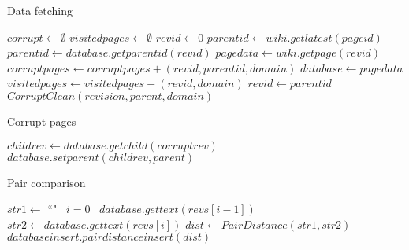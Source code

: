 \newcommand{\tab}[1]{\hspace{.08\textwidth}{#1}}
\newcommand{\LineIf}[3]{ {#1}
  \algorithmicif\ {#2}
  \algorithmicelse\ {#3} }

\begin{algorithm}
  \caption{Data fetching}
  \begin{algorithmic}
    \State $corrupt \gets \emptyset$
    \State $visitedpages \gets \emptyset$
    \State $revid \gets 0$
    \State $parentid \gets wiki.getlatest(pageid)$
    \State $parentid \gets database.getparentid(revid)$
    \Else
    \State $pagedata \gets wiki.getpage(revid)$
    \EndIf
    \State $corruptpages \gets corruptpages + (revid, parentid, domain)$
    \Else
    \State $database \gets page data$
    \EndIf
    \State $visitedpages \gets visitedpages + (revid, domain)$
    \State $revid \gets parentid$
    \EndWhile
    \State $CorruptClean(revision, parent, domain)$
    \EndFor
    \EndProcedure
  \end{algorithmic}
\end{algorithm}

\begin{algorithm}
  \caption{Corrupt pages}\label{corrupt-clean}
  \begin{algorithmic}
    \State $childrev \gets database.getchild(corruptrev)$
    \State $database.setparent(childrev, parent)$ 
    \EndProcedure
  \end{algorithmic}
\end{algorithm}

\begin{algorithm}
\caption{Pair comparison}
  \begin{algorithmic}
    \State $str1 \gets $\LineIf{``"}{$i=0$}{$database.gettext(revs[i-1])$}
    \State $str2 \gets database.gettext(revs[i])$
    \State $dist \gets PairDistance(str1, str2)$
    \State $databaseinsert.pairdistanceinsert(dist)$  
    \EndIf
    \EndFor
  \EndProcedure
  \end{algorithmic}
\end{algorithm}

